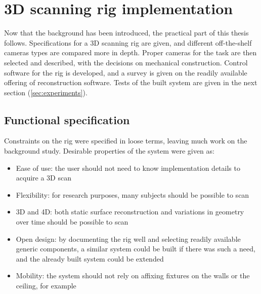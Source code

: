 \section{3D scanning rig implementation} \label{sec:implementation}

Now that the background has been introduced, the practical part of this thesis follows.
Specifications for a 3D scanning rig are given, and different off-the-shelf cameras types are compared more in depth.
Proper cameras for the task are then selected and described, with the decisions on mechanical construction.
Control software for the rig is developed, and a survey is given on the readily available offering of reconstruction software.
Tests of the built system are given in the next section (\ref{sec:experiments}).

\subsection{Functional specification} %

Constraints on the rig were specified in loose terms, leaving much work on the background study.
Desirable properties of the system were given as:

\begin{itemize}
	\item Ease of use: the user should not need to know implementation details to acquire a 3D scan
	\item Flexibility: for research purposes, many subjects should be possible to scan
	\item 3D and 4D: both static surface reconstruction and variations in geometry over time should be possible to scan
	\item Open design: by documenting the rig well and selecting readily available generic components, a similar system could be built if there was such a need, and the already built system could be extended
	\item Mobility: the system should not rely on affixing fixtures on the walls or the ceiling, for example
\end{itemize}


